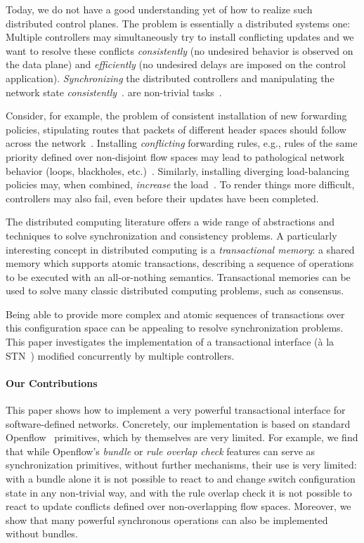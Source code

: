 \documentclass[conference]{sigcomm-alternate}
\begin{document}
Today, we do not have a good understanding yet of how to realize
such distributed control planes. The problem is essentially a
distributed systems
one: Multiple controllers may simultaneously try to
install conflicting updates and we want to resolve these conflicts
\emph{consistently} (no undesired behavior is observed on the data
plane) and \emph{efficiently} (no undesired delays are imposed on the
control application).
\emph{Synchronizing}
the distributed controllers and manipulating the network state \emph{consistently}~\cite{cpc}.
are non-trivial tasks~\cite{cap-theorem}.

Consider, for example, the problem of
consistent installation of new forwarding policies, stipulating routes
that packets of different header spaces should follow across the
network~\cite{network-update,roger-hotnets,correct,stn}.
Installing \emph{conflicting} forwarding rules, e.g., rules of the same priority defined over non-disjoint
flow spaces may lead to pathological network behavior (loops,
blackholes, etc.)~\cite{cpc}.
Similarly, installing diverging load-balancing policies may,
when combined, \emph{increase} the load~\cite{log-cent}.
To render things more difficult, controllers may also fail,
even before their updates have been completed.

The distributed computing literature offers
a wide range of abstractions
and techniques to solve synchronization and consistency problems.
A particularly interesting concept in distributed computing is a \emph{transactional memory}:
a shared memory which supports atomic transactions, describing a sequence of operations
to be executed with an all-or-nothing semantics. Transactional memories can be used to
 solve many
classic distributed computing problems, such as consensus.

Being able to provide more complex and atomic sequences of transactions over this configuration
space can be appealing to resolve synchronization problems.
This paper investigates the implementation of a transactional interface 
(\`{a} la STN~\cite{stn}) modified concurrently by multiple controllers. 


\paragraph{Our Contributions}
This paper shows how to implement a very powerful transactional interface
 for software-defined networks. 
 Concretely, our implementation is based on
 standard Openflow~\cite{of-spec} primitives, which by themselves are very limited.
For example, we find that while Openflow's \emph{bundle} or \emph{rule overlap check}
features can serve as synchronization primitives,
without further mechanisms, their use is very limited:
with a bundle alone it is not possible to react to
and change switch configuration state in any non-trivial way,
and with the rule overlap check it is not possible to react to
update conflicts defined over non-overlapping flow spaces.
Moreover, we show that many powerful synchronous operations
can also be implemented without bundles.
\end{document}

